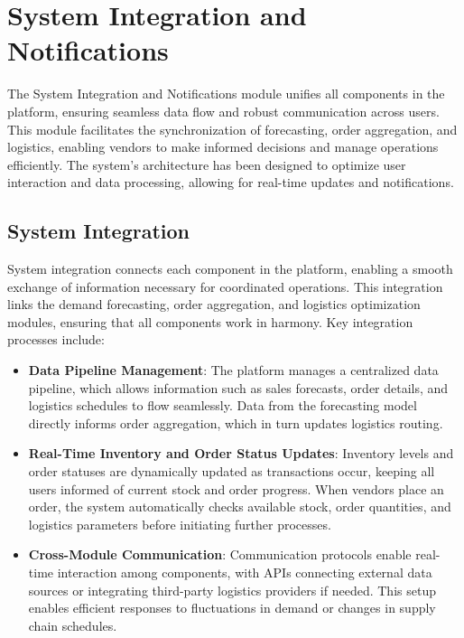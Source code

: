 \section{System Integration and Notifications}

The System Integration and Notifications module unifies all components in the platform, ensuring seamless data flow and robust communication across users. This module facilitates the synchronization of forecasting, order aggregation, and logistics, enabling vendors to make informed decisions and manage operations efficiently. The system's architecture has been designed to optimize user interaction and data processing, allowing for real-time updates and notifications.

\subsection{System Integration}

System integration connects each component in the platform, enabling a smooth exchange of information necessary for coordinated operations. This integration links the demand forecasting, order aggregation, and logistics optimization modules, ensuring that all components work in harmony. Key integration processes include:

\begin{itemize}
    \item \textbf{Data Pipeline Management}: The platform manages a centralized data pipeline, which allows information such as sales forecasts, order details, and logistics schedules to flow seamlessly. Data from the forecasting model directly informs order aggregation, which in turn updates logistics routing.
    \item \textbf{Real-Time Inventory and Order Status Updates}: Inventory levels and order statuses are dynamically updated as transactions occur, keeping all users informed of current stock and order progress. When vendors place an order, the system automatically checks available stock, order quantities, and logistics parameters before initiating further processes.
    \item \textbf{Cross-Module Communication}: Communication protocols enable real-time interaction among components, with APIs connecting external data sources or integrating third-party logistics providers if needed. This setup enables efficient responses to fluctuations in demand or changes in supply chain schedules.
\end{itemize}

